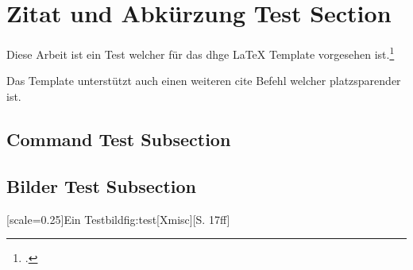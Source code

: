 \section{Zitat und Abkürzung Test Section}

Diese Arbeit ist ein Test welcher f\"ur das \ac{dhge} LaTeX Template vorgesehen ist.\footcite{Xmisc}

Das Template unterstützt auch einen weiteren cite Befehl welcher platzsparender ist.\supercite{Xmisc}

\cleardoublepage

\subsection{Command Test Subsection}

\doubleunderline{$150\mathrm{\Omega}$}

\subsection{Bilder Test Subsection}

[scale=0.25]{Ein Testbild}{fig:test}[Xmisc][S. 17ff]

